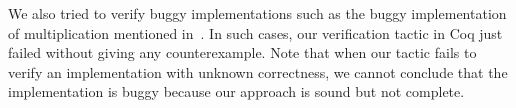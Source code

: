 We also tried to verify buggy implementations such as the buggy implementation of multiplication mentioned in~\cite{C:14:VCS}.
In such cases, our verification tactic in Coq just failed without giving any counterexample.
Note that when our tactic fails to verify an implementation with unknown correctness, we cannot conclude that the implementation is buggy because our approach is sound but not complete.



